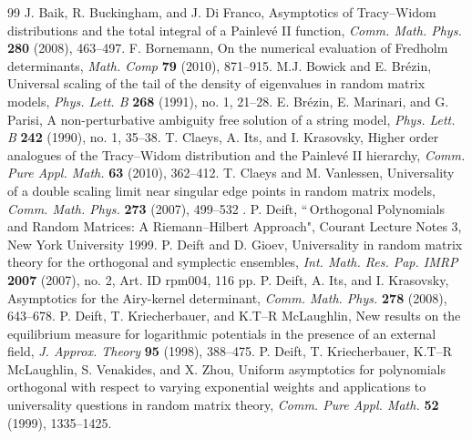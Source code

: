 \documentclass[11pt,fleqn]{article}
\numberwithin{equation}{section}
\begin{document}
\begin{thebibliography}{99}
    J. Baik, R. Buckingham, and J. Di Franco, Asymptotics of Tracy--Widom distributions and the total integral of a Painlev\'e
    II function, {\em Comm. Math.
    Phys.} {\bf 280} (2008), 463--497.
    F. Bornemann, On the numerical evaluation of Fredholm determinants, {\em Math. Comp} {\bf 79} (2010), 871--915.
        M.J. Bowick and E. Br\'ezin,
        Universal scaling of the tail of the density of
            eigenvalues in random matrix models,
        {\em Phys. Lett. B} {\bf 268} (1991), no. 1, 21--28.
        E. Br\'ezin, E. Marinari, and G. Parisi,
        A non-perturbative ambiguity free solution of a string model,
        {\em Phys. Lett. B} {\bf 242} (1990), no. 1, 35--38.
T. Claeys, A. Its, and I. Krasovsky, Higher order analogues of the Tracy--Widom
distribution and the Painlev\'e II hierarchy, {\em Comm. Pure Appl.
Math.} {\bf 63} (2010), 362--412.
T. Claeys and M. Vanlessen, Universality of a double
    scaling limit near singular edge points in random matrix
    models, {\em Comm. Math. Phys.} {\bf 273} (2007), 499--532 .
    P. Deift,
    ``\,Orthogonal Polynomials and Random Matrices: A  Riemann--Hilbert Approach",
    Courant Lecture Notes 3, New York University 1999.
    P. Deift and D. Gioev,
    Universality in random matrix
    theory for the orthogonal and symplectic ensembles,
    {\em Int. Math. Res. Pap. IMRP} {\bf 2007} (2007), no. 2, Art. ID rpm004, 116 pp.
P. Deift, A. Its, and I. Krasovsky, Asymptotics for the Airy-kernel determinant,
{\em Comm. Math. Phys.} {\bf 278} (2008), 643--678.
    P. Deift, T. Kriecherbauer, and K.T--R McLaughlin,
    New results on the equilibrium measure for logarithmic potentials
    in the presence of an external field,
    {\em J. Approx. Theory} {\bf 95} (1998), 388--475.
    P. Deift, T. Kriecherbauer, K.T--R McLaughlin, S. Venakides, and X. Zhou,
    Uniform asymptotics for polynomials orthogonal with respect to
    varying exponential weights and applications to universality
    questions in random matrix theory,
    {\em Comm. Pure Appl. Math.} {\bf 52} (1999), 1335--1425.

\end{thebibliography}
\end{document}
